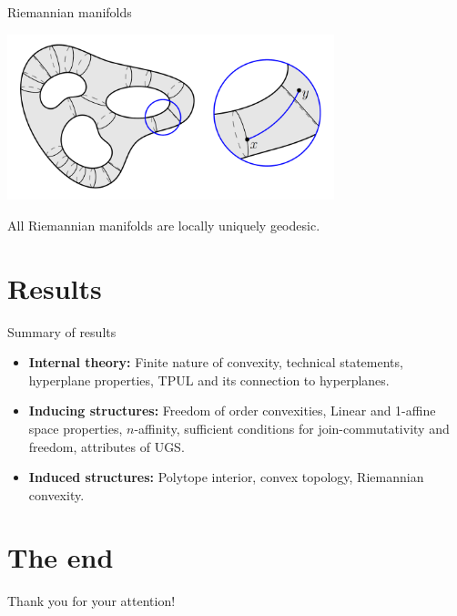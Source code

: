 \documentclass[12pt]{beamer}
\begin{document}
\newpage

\begin{frame}{Riemannian manifolds}
    \centering

    \includegraphics[width = 9.5cm]{16.png}

    \begin{lemma}
        All Riemannian manifolds are locally uniquely geodesic.
    \end{lemma}
\end{frame}

\newpage

\section*{Results}

\begin{frame}{Summary of results}
\footnotesize
\begin{itemize}
    \item \textbf{Internal theory:} Finite nature of convexity, technical statements, hyperplane properties, TPUL and its connection to hyperplanes.

    \item \textbf{Inducing structures:} Freedom of order convexities, Linear and 1-affine space properties, \(n\)-affinity, sufficient conditions for join-commutativity and freedom, attributes of UGS.
    
    \item \textbf{Induced structures:} Polytope interior, convex topology, Riemannian convexity.
\end{itemize}
\end{frame}

\section*{The end}

\begin{frame}
    \centering

    \vspace{12mm}

    {\LARGE Thank you for your attention!}
\end{frame}
\end{document}
